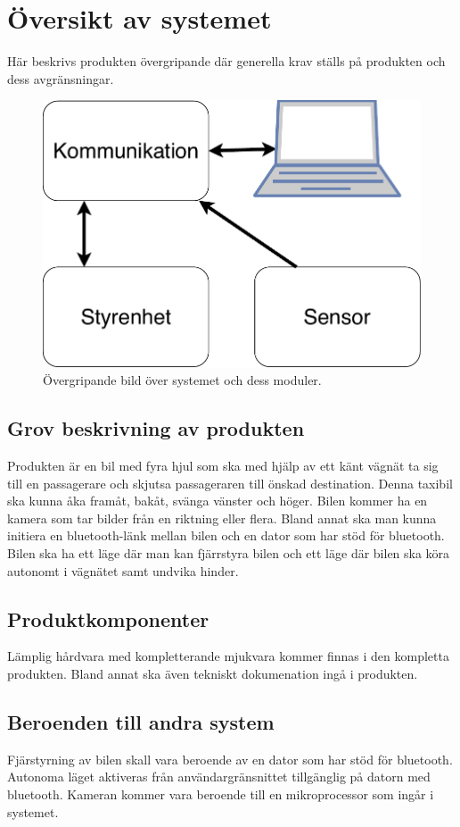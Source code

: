 \documentclass[kravspec/krav.tex]{subfiles}
\begin{document}
\section{Översikt av systemet}
Här beskrivs produkten övergripande där generella krav ställs på produkten och dess avgränsningar.
\begin{figure}[h]
    \centering
    \includegraphics[width=0.6\linewidth]{kravspec/figures/overview-schema.pdf}
    \caption{Övergripande bild över systemet och dess moduler.}
    \label{fig:overview}
\end{figure}

\subsection{Grov beskrivning av produkten}
Produkten är en bil med fyra hjul som ska med hjälp av ett känt vägnät ta sig
till en passagerare och skjutsa passageraren till önskad destination. Denna
taxibil ska kunna åka framåt, bakåt, svänga vänster och höger. Bilen kommer ha
en kamera som tar bilder från en riktning eller flera.  Bland annat ska
man kunna initiera en bluetooth-länk mellan bilen och en dator som har stöd för
bluetooth. Bilen ska ha ett läge där man kan fjärrstyra bilen och ett läge där
bilen ska köra autonomt i vägnätet samt undvika hinder.

\subsection{Produktkomponenter}
Lämplig hårdvara med kompletterande mjukvara kommer finnas i den kompletta
produkten. Bland annat ska även tekniskt dokumenation ingå i produkten.

\subsection{Beroenden till andra system}
Fjärstyrning av bilen skall vara beroende av en dator som har stöd för bluetooth.
Autonoma läget aktiveras från användargränsnittet tillgänglig på datorn med
bluetooth. Kameran kommer vara beroende till en mikroprocessor som ingår i systemet.
\end{document}
